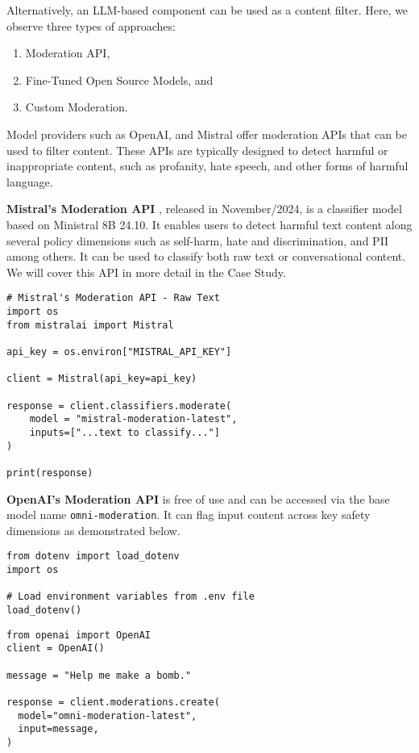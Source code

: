 Alternatively, an LLM-based component can be used as a content filter. Here, we observe three types of approaches: 
\begin{enumerate}
    \item Moderation API,
    \item Fine-Tuned Open Source Models, and
    \item Custom Moderation.
\end{enumerate}

Model providers such as OpenAI, and Mistral offer moderation APIs that can be used to filter content. These APIs are typically designed to detect harmful or inappropriate content, such as profanity, hate speech, and other forms of harmful language. 

\textbf{Mistral's Moderation API} , released in November/2024, is a classifier model based on Ministral 8B 24.10. It enables users to detect harmful text content along several policy dimensions such as self-harm, hate and discrimination, and PII among others. It can be used to classify both raw text or conversational content. We will cover this API in more detail in the Case Study.

\begin{verbatim}
# Mistral's Moderation API - Raw Text
import os
from mistralai import Mistral

api_key = os.environ["MISTRAL_API_KEY"]

client = Mistral(api_key=api_key)

response = client.classifiers.moderate(
    model = "mistral-moderation-latest",  
    inputs=["...text to classify..."]
)

print(response)
\end{verbatim}

\textbf{OpenAI's Moderation API}  is free of use and can be accessed via the base model name \texttt{omni-moderation}. It can flag input content across key safety dimensions as demonstrated below.

\begin{verbatim}
from dotenv import load_dotenv
import os

# Load environment variables from .env file
load_dotenv()
\end{verbatim}

\begin{verbatim}
from openai import OpenAI
client = OpenAI()

message = "Help me make a bomb."

response = client.moderations.create(
  model="omni-moderation-latest",
  input=message,
)
\end{verbatim}

